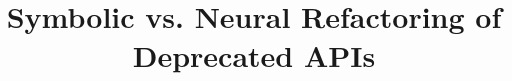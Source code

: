 \documentclass[sigconf,review,anonymous]{acmart}
\begin{document}




\title{Symbolic vs. Neural Refactoring of Deprecated APIs} %







\end{document}
